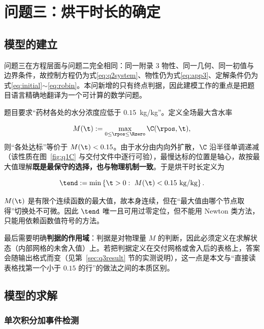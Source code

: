 \section{问题三：烘干时长的确定}
\label{sec:q3}

\subsection{模型的建立}
\label{sec:q3model}

问题三在方程层面与问题二完全相同：同一附录 3 物性、同一几何、同一初值与边界条件，故控制方程仍为式\eqref{eq:q2system}、物性仍为式\eqref{eq:app3}、定解条件仍为式\eqref{eq:initial}$\sim$\eqref{eq:robin}。本问新增的只有终点判据，因此建模工作的重点是把题目语言精确地翻译为一个可计算的数学问题。

题目要求``药材各处的水分浓度应低于 $0.15$~kg/kg''。定义全场最大含水率

\begin{equation}
M(\t):=\max_{0\le \rpos\le \Rzero}\C(\rpos,\t),
\label{eq:M}
\end{equation}
则``各处达标''等价于 $M(\t)<0.15$。由于水分由内向外扩散，$\C$ 沿半径单调递减（该性质在图~\ref{fig:q1C} 与交付文件中逐行可验），最慢达标的位置是轴心，故按最大值理解\textbf{既是最保守的选择，也与物理机制一致}。于是烘干时长定义为

\begin{equation}
\tend:=\min\left\{\t>0:\ M(\t)<0.15~\mathrm{kg/kg}\right\}.
\label{eq:tend}
\end{equation}

$M(\t)$ 是有限个连续函数的最大值，故本身连续，但在``最大值由哪个节点取得''切换处不可微。因此 $\tend$ 唯一且可用过零定位，但不能用 Newton 类方法，只能用依赖函数值符号的方法。

最后需要明确\textbf{判据的作用域}：判据是对物理量 $M$ 的判断，因此必须定义在求解状态（内部网格的未舍入值）上。若把判据定义在交付网格或舍入后的表格上，答案会随输出格式而变（见第~\ref{sec:q3result} 节的实测说明），这一点是本文与``直接读表格找第一个小于 $0.15$ 的行''的做法之间的本质区别。

\subsection{模型的求解}
\label{sec:q3solve}

\subsubsection{单次积分加事件检测}

